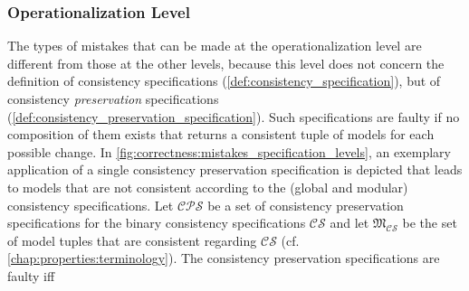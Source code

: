 \subsubsection{Operationalization Level}
The types of mistakes that can be made at the operationalization level are different from those at the other levels, because this level does not concern the definition of consistency specifications (\autoref{def:consistency_specification}), but of consistency \emph{preservation} specifications (\autoref{def:consistency_preservation_specification}).
Such specifications are faulty if no composition of them exists that returns a consistent tuple of models for each possible change. %
In \autoref{fig:correctness:mistakes_specification_levels}, an exemplary application of a single consistency preservation specification is depicted that leads to models that are not consistent according to the (global and modular) consistency specifications.
Let $\mathcal{CPS}$ be a set of consistency preservation specifications  %
for the binary consistency specifications $\mathcal{CS}$ %
and
let $\mathfrak{M}_{\mathcal{CS}}$ be the set of model tuples that are consistent regarding $\mathcal{CS}$ (cf. \autoref{chap:properties:terminology}). 
The consistency preservation specifications are faulty iff
